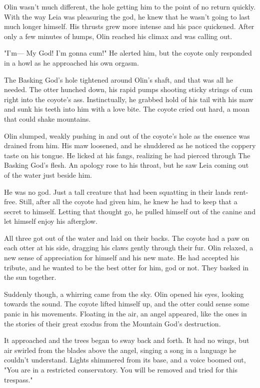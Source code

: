Olin wasn't much different, the hole getting him to the point of no return quickly. With the way Leia was pleasuring the god, he knew that he wasn't going to last much longer himself. His thrusts grew more intense and his pace quickened. After only a few minutes of humps, Olin reached his climax and was calling out.

"I'm--- My God! I'm gonna cum!" He alerted him, but the coyote only responded in a howl as he approached his own orgasm.

The Basking God's hole tightened around Olin's shaft, and that was all he needed. The otter hunched down, his rapid pumps shooting sticky strings of cum right into the coyote's ass. Instinctually, he grabbed hold of his tail with his maw and sunk his teeth into him with a love bite. The coyote cried out hard, a moan that could shake mountains.

Olin slumped, weakly pushing in and out of the coyote's hole as the essence was drained from him. His maw loosened, and he shuddered as he noticed the coppery taste on his tongue. He licked at his fangs, realizing he had pierced through The Basking God's flesh. An apology rose to his throat, but he saw Leia coming out of the water just beside him.

He was no god. Just a tall creature that had been squatting in their lands rent-free. Still, after all the coyote had given him, he knew he had to keep that a secret to himself. Letting that thought go, he pulled himself out of the canine and let himself enjoy his afterglow.

All three got out of the water and laid on their backs. The coyote had a paw on each otter at his side, dragging his claws gently through their fur. Olin relaxed, a new sense of appreciation for himself and his new mate. He had accepted his tribute, and he wanted to be the best otter for him, god or not. They basked in the sun together.

Suddenly though, a whirring came from the sky. Olin opened his eyes, looking towards the sound. The coyote lifted himself up, and the otter could sense some panic in his movements. Floating in the air, an angel appeared, like the ones in the stories of their great exodus from the Mountain God's destruction.

It approached and the trees began to sway back and forth. It had no wings, but air swirled from the blades above the angel, singing a song in a language he couldn't understand. Lights shimmered from its base, and a voice boomed out, "You are in a restricted conservatory. You will be removed and tried for this trespass."

